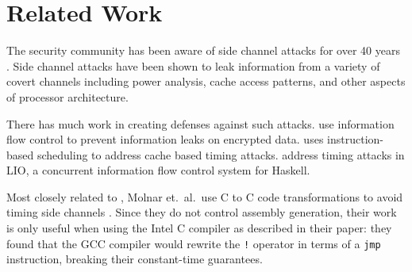 \section{Related Work}
\label{sec:related}

The security community has been aware of side channel attacks for over 40 years
\cite{lampson1973, wray1991, lipner1975, brumley2005remote}. Side channel attacks have been
shown to leak information from a variety of covert channels including power analysis\cite{Vaudenay2016},
cache access patterns\cite{liu2015}, and other aspects of processor architecture\cite{wang2004}.

There has much work in creating defenses against such attacks.
\cite{planul2013,mitchell2012} use information flow control
to prevent information leaks on encrypted data. \cite{stefan2013} uses
instruction-based scheduling to address cache based timing attacks.
\cite{stefan2012,buiras2014} address timing attacks in LIO, a concurrent
information flow control system for Haskell.

Most closely related to \constc, Molnar et.\ al.\ use C to C code transformations to avoid timing side
channels \cite{molnar2005}. Since they do not control assembly generation, their work is only useful
when using the Intel C compiler as described in their paper: they found that the GCC compiler would rewrite the \texttt{!}
operator in terms of a \texttt{jmp} instruction, breaking their constant-time guarantees.
